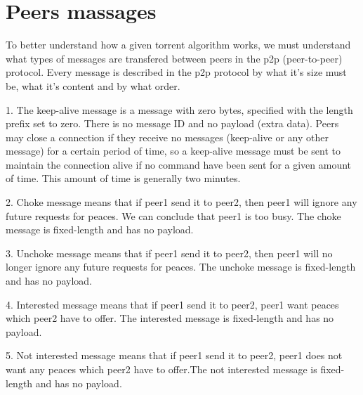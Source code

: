\documentclass[11pt]{article}
\begin{document}
  \section*{Peers massages}
  \begin{flushleft}

    To better understand how a given torrent algorithm works, we must understand what types of messages are transfered between peers in the p2p (peer-to-peer) protocol. Every message is described in the p2p protocol by what it's size must be, what it's content and by what order.

  \end{flushleft}
  \begin{flushleft}

    1. The keep-alive message is a message with zero bytes, specified with the length prefix set to zero. There is no message ID and no payload (extra data). Peers may close a connection if they receive no messages (keep-alive or any other message) for a certain period of time, so a keep-alive message must be sent to maintain the connection alive if no command have been sent for a given amount of time. This amount of time is generally two minutes.

  \end{flushleft}
  \begin{flushleft}

    2. Choke message means that if peer1 send it to peer2, then peer1 will ignore any future requests for peaces. We can conclude that peer1 is too busy. The choke message is fixed-length and has no payload.

  \end{flushleft}
  \begin{flushleft}

    3. Unchoke message means that if peer1 send it to peer2, then peer1 will no longer ignore any future requests for peaces. The unchoke message is fixed-length and has no payload.

  \end{flushleft}
  \begin{flushleft}

    4. Interested message means that if peer1 send it to peer2, peer1 want peaces which peer2 have to offer. The interested message is fixed-length and has no payload.

  \end{flushleft}
  \begin{flushleft}

    5. Not interested message means that if peer1 send it to peer2, peer1 does not want any peaces which peer2 have to offer.The not interested message is fixed-length and has no payload.

  \end{flushleft}
\end{document}
